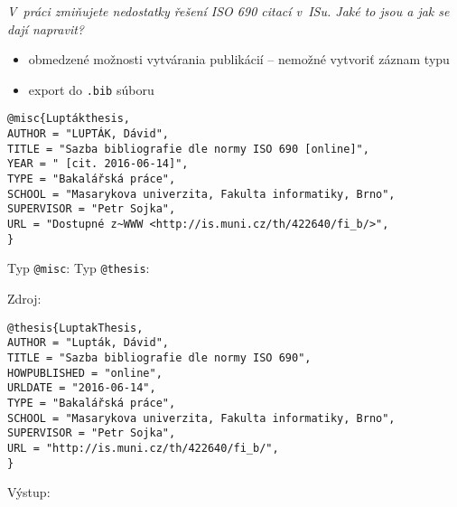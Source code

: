 \documentclass{beamer}
\newcommand{\cmd}[1]{\texttt{#1}}
\begin{document}
\begin{frame}[fragile]
\emph{V~práci zmiňujete nedostatky řešení ISO 690 citací v~ISu. Jaké to jsou a jak se dají napravit?}
\medskip\par
\begin{itemize}
\item obmedzené možnosti vytvárania publikácií -- nemožné vytvoriť záznam typu 
\item export do \texttt{.bib} súboru
\end{itemize}

\begin{verbatim}
@misc{Luptákthesis,
AUTHOR = "LUPTÁK, Dávid",
TITLE = "Sazba bibliografie dle normy ISO 690 [online]",
YEAR = " [cit. 2016-06-14]",
TYPE = "Bakalářská práce", 
SCHOOL = "Masarykova univerzita, Fakulta informatiky, Brno",
SUPERVISOR = "Petr Sojka", 
URL = "Dostupné z~WWW <http://is.muni.cz/th/422640/fi_b/>",
}
\end{verbatim}
\end{frame}

\begin{frame}
Typ \cmd{@misc}:
\newline
{}
\newline
\newline
Typ \cmd{@thesis}:
\newline
{}
\end{frame}

\begin{frame}[fragile]
Zdroj:
\begin{verbatim}
@thesis{LuptakThesis,
AUTHOR = "Lupták, Dávid",
TITLE = "Sazba bibliografie dle normy ISO 690",
HOWPUBLISHED = "online",
URLDATE = "2016-06-14",
TYPE = "Bakalářská práce", 
SCHOOL = "Masarykova univerzita, Fakulta informatiky, Brno",
SUPERVISOR = "Petr Sojka", 
URL = "http://is.muni.cz/th/422640/fi_b/",
}
\end{verbatim}

Výstup:
\newline
{}
\end{frame}
\end{document}
